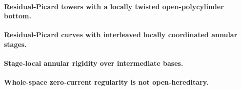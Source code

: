 \paragraph{Residual-Picard towers with a locally twisted open-polycylinder bottom.}



\paragraph{Residual-Picard curves with interleaved locally coordinated annular stages.}



\paragraph{Stage-local annular rigidity over intermediate bases.}



\paragraph{Whole-space zero-current regularity is not open-hereditary.}



